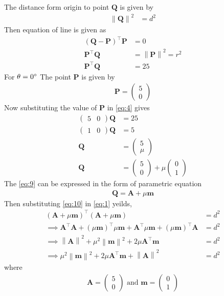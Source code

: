 \documentclass[12pt]{article}
\providecommand{\brak}[1]{\ensuremath{\left(#1\right)}}
\providecommand{\norm}[1]{\left\lVert#1\right\rVert}
\newcommand{\myvec}[1]{\ensuremath{\begin{pmatrix}#1\end{pmatrix}}}
\let\vec\mathbf
\begin{document}
\begin{enumerate}
\begin{table}[ht!]\centering

\caption{}
\label{Table-1} 
\end{table}
		The distance form origin to point $\vec{Q}$ is given by
\begin{align}
	\norm{\vec{Q}}^2&=d^2\label{eq:1}
\end{align}
Then equation of line is given as
\begin{align}
\brak{\vec{Q}-\vec{P}}^{\top}\vec{P}&=0\\
\vec{P}^{\top}\vec{Q}&=\norm{\vec{P}}^2=r^2\\
	\vec{P}^{\top}\vec{Q}&=25\label{eq:4}
\end{align}
For $\theta=0\degree$ The point $\vec{P}$ is given by
\begin{align}
\vec{P}=\myvec{5\\0}
\end{align}
Now substituting the value of $\vec{P}$ in \eqref{eq:4} gives
\begin{align}
\myvec{5&0}\vec{Q}&=25\\
\myvec{1&0}\vec{Q}&=5\\
\vec{Q}&=\myvec{5\\ \mu}\\
	\vec{Q}&=\myvec{5\\0}+\mu\myvec{0\\1}\label{eq:9}
\end{align}
		The \eqref{eq:9} can be expressed in the form of parametric equation
\begin{align}
	\vec{Q}=\vec{A}+\mu\vec{m}\label{eq:10}
\end{align}
		Then substituting \eqref{eq:10} in \eqref{eq:1} yeilds,
\begin{align}
	\brak{\vec{A}+\mu\vec{m}}^{\top}\brak{\vec{A}+\mu\vec{m}}&=d^2\\
\implies \vec{A}^{\top}\vec{A}+\brak{\mu\vec{m}}^{\top}\mu\vec{m}+\vec{A}^{\top}\mu\vec{m}+\brak{\mu\vec{m}}^{\top}\vec{A}&=d^2\\
\implies \norm{\vec{A}}^2+\mu^2\norm{\vec{m}}^2+2\mu\vec{A}^{\top}\vec{m}&=d^2\\
	\implies \mu^2\norm{\vec{m}}^2+2\mu\vec{A}^{\top}\vec{m}+\norm{\vec{A}}^2&=d^2\label{eq:14}
\end{align}
where
\begin{align}                                                                          \vec{A}=\myvec{5\\0}\text{ and }\vec{m}=\myvec{0\\1}

\end{align}
\end{enumerate}
\end{document}
